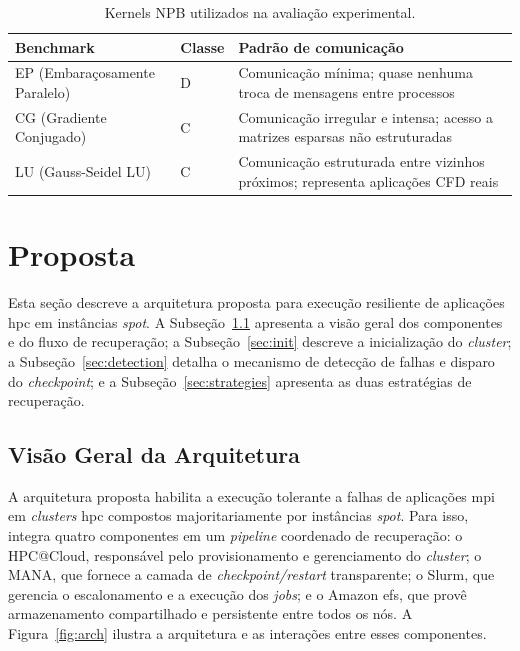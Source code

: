 \documentclass[a4paper,11pt]{article}
\begin{document}
            \begin{table}[htb]
                \caption{Kernels NPB utilizados na avaliação experimental.}
                \label{tab:npb}
                \centering
                \small
                \begin{tabular}{llp{6.5cm}}
                    \toprule
                    \textbf{Benchmark} & \textbf{Classe} & \textbf{Padrão de comunicação} \\
                    \midrule
                    EP (Embaraçosamente Paralelo) & D & Comunicação mínima; quase nenhuma troca de mensagens entre processos \\
                    CG (Gradiente Conjugado)      & C & Comunicação irregular e intensa; acesso a matrizes esparsas não estruturadas \\
                    LU (Gauss-Seidel LU)          & C & Comunicação estruturada entre vizinhos próximos; representa aplicações CFD reais \\
                    \bottomrule
                \end{tabular}
            \end{table}

    \section{Proposta}
    \label{sec:proposta}

        Esta seção descreve a arquitetura proposta para execução resiliente de
        aplicações \gls{hpc} em instâncias \textit{spot}. A
        Subseção~\ref{sec:arch} apresenta a visão geral dos componentes e do fluxo
        de recuperação; a Subseção~\ref{sec:init} descreve a inicialização do
        \textit{cluster}; a Subseção~\ref{sec:detection} detalha o mecanismo de
        detecção de falhas e disparo do \textit{checkpoint}; e a
        Subseção~\ref{sec:strategies} apresenta as duas estratégias de recuperação.

        \subsection{Visão Geral da Arquitetura}
        \label{sec:arch}

            A arquitetura proposta habilita a execução tolerante a falhas de aplicações
            \gls{mpi} em \textit{clusters} \gls{hpc} compostos majoritariamente por
            instâncias \textit{spot}. Para isso, integra quatro componentes em um
            \textit{pipeline} coordenado de recuperação: o HPC@Cloud, responsável pelo
            provisionamento e gerenciamento do \textit{cluster}; o MANA, que fornece a
            camada de \textit{checkpoint/restart} transparente; o Slurm, que gerencia o
            escalonamento e a execução dos \textit{jobs}; e o Amazon \gls{efs}, que
            provê armazenamento compartilhado e persistente entre todos os nós.
            A Figura~\ref{fig:arch} ilustra a arquitetura e as interações entre esses
            componentes.
\end{document}
